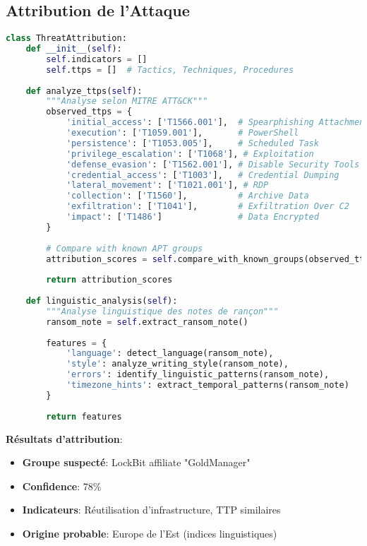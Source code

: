 \subsection{Attribution de l'Attaque}
\begin{lstlisting}[language=Python, caption=Analyse selon MITRE ATT&CK]
class ThreatAttribution:
    def __init__(self):
        self.indicators = []
        self.ttps = []  # Tactics, Techniques, Procedures
    
    def analyze_ttps(self):
        """Analyse selon MITRE ATT&CK"""
        observed_ttps = {
            'initial_access': ['T1566.001'],  # Spearphishing Attachment
            'execution': ['T1059.001'],       # PowerShell
            'persistence': ['T1053.005'],     # Scheduled Task
            'privilege_escalation': ['T1068'], # Exploitation
            'defense_evasion': ['T1562.001'], # Disable Security Tools
            'credential_access': ['T1003'],   # Credential Dumping
            'lateral_movement': ['T1021.001'], # RDP
            'collection': ['T1560'],          # Archive Data
            'exfiltration': ['T1041'],        # Exfiltration Over C2
            'impact': ['T1486']               # Data Encrypted
        }
        
        # Compare with known APT groups
        attribution_scores = self.compare_with_known_groups(observed_ttps)
        
        return attribution_scores
    
    def linguistic_analysis(self):
        """Analyse linguistique des notes de rançon"""
        ransom_note = self.extract_ransom_note()
        
        features = {
            'language': detect_language(ransom_note),
            'style': analyze_writing_style(ransom_note),
            'errors': identify_linguistic_patterns(ransom_note),
            'timezone_hints': extract_temporal_patterns(ransom_note)
        }
        
        return features
\end{lstlisting}

\textbf{Résultats d'attribution}:

\begin{itemize}
\item \textbf{Groupe suspecté}: LockBit affiliate "GoldManager"
\item \textbf{Confidence}: 78\%
\item \textbf{Indicateurs}: Réutilisation d'infrastructure, TTP similaires
\item \textbf{Origine probable}: Europe de l'Est (indices linguistiques)
\end{itemize}

